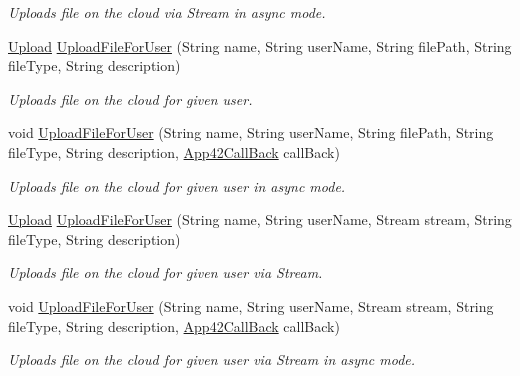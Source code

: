 \begin{DoxyCompactItemize}
\begin{DoxyCompactList}\small\item\em Uploads file on the cloud via Stream in async mode. \end{DoxyCompactList}\item 
\hyperlink{classcom_1_1shephertz_1_1app42_1_1paas_1_1sdk_1_1csharp_1_1upload_1_1_upload}{Upload} \hyperlink{classcom_1_1shephertz_1_1app42_1_1paas_1_1sdk_1_1csharp_1_1upload_1_1_upload_service_ac2184711eca0574145987724503c412f}{Upload\+File\+For\+User} (String name, String user\+Name, String file\+Path, String file\+Type, String description)
\begin{DoxyCompactList}\small\item\em Uploads file on the cloud for given user. \end{DoxyCompactList}\item 
void \hyperlink{classcom_1_1shephertz_1_1app42_1_1paas_1_1sdk_1_1csharp_1_1upload_1_1_upload_service_a26b6816db84d7e424cc0f0be68940af3}{Upload\+File\+For\+User} (String name, String user\+Name, String file\+Path, String file\+Type, String description, \hyperlink{interfacecom_1_1shephertz_1_1app42_1_1paas_1_1sdk_1_1csharp_1_1_app42_call_back}{App42\+Call\+Back} call\+Back)
\begin{DoxyCompactList}\small\item\em Uploads file on the cloud for given user in async mode. \end{DoxyCompactList}\item 
\hyperlink{classcom_1_1shephertz_1_1app42_1_1paas_1_1sdk_1_1csharp_1_1upload_1_1_upload}{Upload} \hyperlink{classcom_1_1shephertz_1_1app42_1_1paas_1_1sdk_1_1csharp_1_1upload_1_1_upload_service_a11df1eff9bb8e89f6764c610a96b343c}{Upload\+File\+For\+User} (String name, String user\+Name, Stream stream, String file\+Type, String description)
\begin{DoxyCompactList}\small\item\em Uploads file on the cloud for given user via Stream. \end{DoxyCompactList}\item 
void \hyperlink{classcom_1_1shephertz_1_1app42_1_1paas_1_1sdk_1_1csharp_1_1upload_1_1_upload_service_a7597157351d8dd6704e7746115637d9d}{Upload\+File\+For\+User} (String name, String user\+Name, Stream stream, String file\+Type, String description, \hyperlink{interfacecom_1_1shephertz_1_1app42_1_1paas_1_1sdk_1_1csharp_1_1_app42_call_back}{App42\+Call\+Back} call\+Back)
\begin{DoxyCompactList}\small\item\em Uploads file on the cloud for given user via Stream in async mode. \end{DoxyCompactList}\item 

\end{DoxyCompactItemize}
